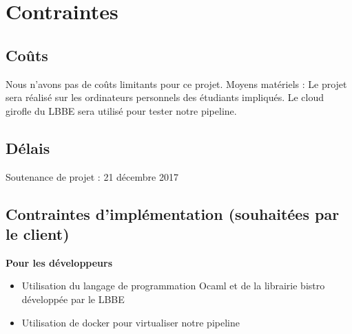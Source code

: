 \section{Contraintes}


\subsection{Coûts}

Nous n’avons pas de coûts limitants pour ce projet. 
Moyens matériels : Le projet sera réalisé sur les ordinateurs personnels des étudiants impliqués. Le cloud girofle du LBBE sera utilisé pour tester notre pipeline.


\subsection{Délais}



\forceindent Soutenance de projet : 21 décembre 2017


\subsection{Contraintes d'implémentation (souhaitées par le client)}

\textbf{Pour les développeurs}

\begin{itemize}
\setlength{\itemindent}{.2in}
\item Utilisation du langage de programmation Ocaml et de la librairie bistro développée par le LBBE
\item Utilisation de docker pour virtualiser notre pipeline
\end{itemize}



